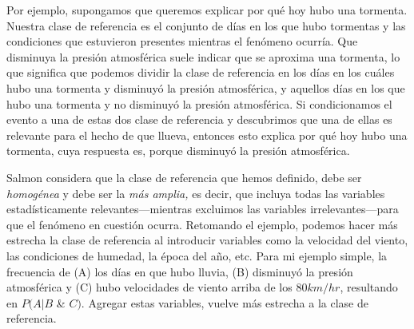 Por ejemplo, supongamos que queremos explicar por qué hoy
hubo una tormenta. Nuestra clase de referencia es el
conjunto de días en los que hubo tormentas y las condiciones
que estuvieron presentes mientras el fenómeno ocurría. Que
disminuya la presión atmosférica suele indicar que se
aproxima una tormenta, lo que significa que podemos dividir
la clase de referencia en los días en los cuáles hubo una
tormenta y disminuyó la presión atmosférica, y aquellos días
en los que hubo una tormenta y no disminuyó la presión
atmosférica. Si condicionamos el evento a una de estas dos
clase de referencia y descubrimos que una de ellas es
relevante para el hecho de que llueva, entonces esto explica
por qué hoy hubo una tormenta, cuya respuesta es, porque
disminuyó la presión atmosférica.

Salmon considera que la clase de referencia que hemos
definido, debe ser \emph{homogénea} y debe ser la \emph{más
amplia,} es decir, que incluya todas las variables
estadísticamente relevantes---mientras excluimos las
variables irrelevantes---para que el fenómeno en cuestión
ocurra. Retomando el ejemplo, podemos hacer más estrecha la
clase de referencia al introducir variables como la
velocidad del viento, las condiciones de humedad, la época
del año, etc. Para mi ejemplo simple, la frecuencia de (A)
los días en que hubo lluvia, (B) disminuyó la presión
atmosférica y (C) hubo velocidades de viento arriba de los $
80km/hr $, resultando en $ P( A | B$ \& $ C ) $. Agregar
estas variables, vuelve más estrecha a la clase de
referencia.


